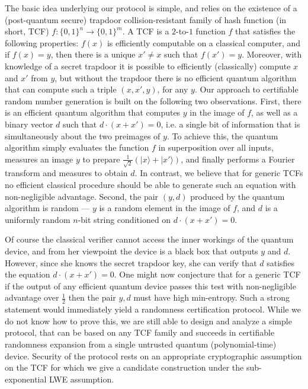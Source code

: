 \documentclass[11pt]{article}
\theoremstyle{remark}
\theoremstyle{definition}
\newcommand{\ket}[1]{|#1\rangle}
\begin{document}
The basic idea underlying our protocol is simple, and relies on the existence of a (post-quantum secure) trapdoor collision-resistant family of hash function (in short, TCF) $f:\{0,1\}^n \rightarrow \{0,1\}^m$.
A TCF is a $2$-to-$1$ function $f$ that satisfies the following properties: $f(x)$ is efficiently computable on a classical computer, and if $f(x) = y$, then there is a unique 
$x' \neq x$ such that $ f(x') = y$. Moreover, with knowledge of a secret trapdoor  it is possible to efficiently (classically) compute $x$ and $x'$ from $y$, but without the trapdoor there is no efficient 
quantum algorithm that can compute such a triple $(x, x', y)$, for any $y$. 
Our approach to certifiable random number generation is built on the following two observations. First, there is an efficient quantum algorithm that 
computes $y$ in the image of $f$, as well as a binary vector $d$ such that  $d\cdot(x + x') = 0$, i.e. a single bit of information that is simultaneously about the two preimages of $y$. To achieve this, the quantum algorithm simply evaluates the function $f$ in superposition over all inputs, measures an image $y$ to prepare $\frac{1}{\sqrt{2}}(\ket{x}+\ket{x'})$, and finally performs a Fourier transform and measures to obtain $d$. In contrast, we 
believe that for generic TCFs no efficient classical procedure should be able to generate such an equation with non-negligible advantage. Second, the pair $(y, d)$ produced by the quantum 
algorithm is random --- $y$ is a random element in the image of $f$, and $d$ is a uniformly random $n$-bit string conditioned on $d\cdot(x + x') = 0$.


Of course the classical verifier cannot access the inner workings of the quantum device, and from her viewpoint the device is a black box that outputs $y$ and $d$. However, since she knows the secret trapdoor key, she can verify that $d$ satisfies the equation  $d\cdot(x + x') = 0$. 
One might now conjecture that for a generic TCF if the output of any efficient quantum device passes this test with non-negligible advantage over $\frac{1}{2}$ then the pair $y,d$ must have high min-entropy. Such a strong statement would immediately yield a randomness certification protocol. 
While we do not know how to prove this, we are still able to design and analyze a simple protocol, that can be based on any TCF family and succeeds in certifiable randomness expansion from a single untrusted quantum (polynomial-time) device. Security of the protocol rests on an appropriate cryptographic assumption on the TCF for which we give a candidate construction under the sub-exponential LWE assumption. 
\end{document}
